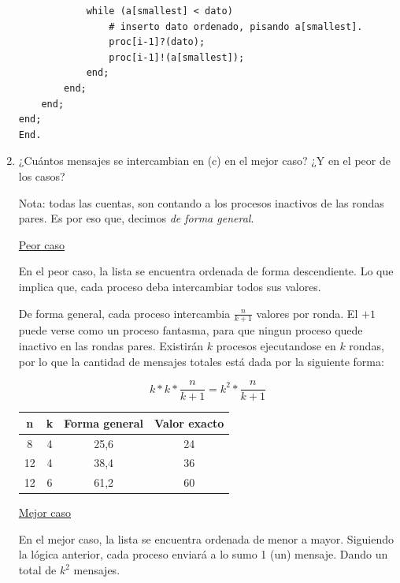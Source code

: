 \documentclass[a4paper, 10pt]{article}
\newenvironment{QandA}{
    \begin{enumerate}\bfseries}
    {\end{enumerate}
}
\newenvironment{answered}{\par\normalfont}{}
\begin{document}
\begin{QandA}
\begin{enumerate}[labelindent=0pt, align=left, leftmargin=0pt]
\begin{answered}
\begin{lstlisting}
            while (a[smallest] < dato)
                # inserto dato ordenado, pisando a[smallest].
                proc[i-1]?(dato);
                proc[i-1]!(a[smallest]);
            end;
        end;
    end;
end;
End.
\end{lstlisting}
\end{answered}
\item ¿Cuántos mensajes se intercambian en (c) en el mejor caso? ¿Y en el peor de los casos?
\begin{answered}
Nota: todas las cuentas, son contando a los procesos inactivos de las rondas pares. Es por eso que, decimos \emph{de forma general}.

\underline{Peor caso}

En el peor caso, la lista se encuentra ordenada de forma descendiente. Lo que implica que, cada proceso deba intercambiar todos sus valores.

De forma general, cada proceso intercambia $\frac{n}{k+1}$ valores por ronda. El $+1$ puede verse como un proceso fantasma, para que ningun proceso quede inactivo en las rondas pares. Existirán $k$ procesos ejecutandose en $k$ rondas, por lo que la cantidad de mensajes totales está dada por la siguiente forma:

\begin{equation}
    k * k * \frac{n}{k+1} = k^2 * \frac{n}{k+1}
\end{equation}

{\renewcommand{\arraystretch}{2}%
\begin{center}
\begin{tabular}{c c c c}
\textbf{n} & \textbf{k} &  \textbf{Forma general} & \textbf{Valor exacto} \\
\hline
8 & 4 & 25,6 & 24\\
\hline
12 & 4 & 38,4 & 36\\
\hline
12 & 6 & 61,2 &  60\\
\end{tabular}
\end{center}}  

\underline{Mejor caso}

En el mejor caso, la lista se encuentra ordenada de menor a mayor. Siguiendo la lógica anterior, cada proceso enviará a lo sumo 1 (un) mensaje. Dando un total de $k^2$ mensajes.

\end{answered}


\end{enumerate}
\end{QandA}
\end{document}
